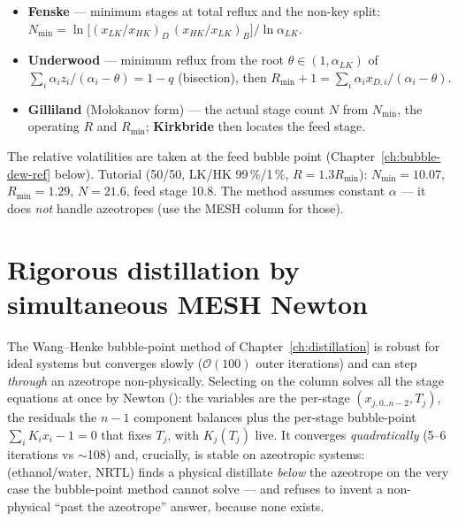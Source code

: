 \documentclass[11pt,a4paper]{article}
\begin{document}
\begin{itemize}[leftmargin=*,nosep,topsep=2pt]
  \item \textbf{Fenske} --- minimum stages at total reflux and the
        non-key split:
        $N_{\min} = \ln\!\bigl[(x_{LK}/x_{HK})_D\,(x_{HK}/x_{LK})_B\bigr]
        / \ln\alpha_{LK}$.
  \item \textbf{Underwood} --- minimum reflux from the root $\theta\in
        (1,\alpha_{LK})$ of $\sum_i \alpha_i z_i/(\alpha_i-\theta) =
        1-q$ (bisection), then $R_{\min}+1 = \sum_i \alpha_i x_{D,i}/
        (\alpha_i-\theta)$.
  \item \textbf{Gilliland} (Molokanov form) --- the actual stage count
        $N$ from $N_{\min}$, the operating $R$ and $R_{\min}$;
        \textbf{Kirkbride} then locates the feed stage.
\end{itemize}
The relative volatilities are taken at the feed bubble point
(Chapter~\ref{ch:bubble-dew-ref} below).  Tutorial
 (50/50, LK/HK 99\,\%/1\,\%,
$R=1.3R_{\min}$): $N_{\min}=10.07$, $R_{\min}=1.29$, $N=21.6$, feed
stage 10.8.  The method assumes constant $\alpha$ --- it does
\emph{not} handle azeotropes (use the MESH column for those).

\section{Rigorous distillation by simultaneous MESH
Newton}\label{ch:mesh}

The Wang--Henke bubble-point method of Chapter~\ref{ch:distillation} is
robust for ideal systems but converges slowly ($\mathcal O(100)$ outer
iterations) and can step \emph{through} an azeotrope non-physically.
Selecting  on the column solves all the stage
equations at once by Newton (): the variables are
the per-stage $(x_{j,0..n-2}, T_j)$, the residuals the $n-1$ component
balances plus the per-stage bubble-point $\sum_i K_i x_i - 1 = 0$ that
fixes $T_j$, with $K_j(T_j)$ live.  It converges \emph{quadratically}
(5--6 iterations vs $\sim$108) and, crucially, is stable on azeotropic
systems:  (ethanol/water, NRTL) finds a
physical distillate \emph{below} the azeotrope on the very case the
bubble-point method cannot solve --- and refuses to invent a
non-physical ``past the azeotrope'' answer, because none exists.

\end{document}
